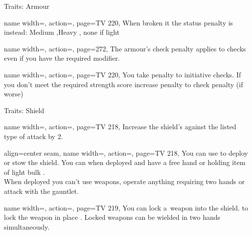 \begin{PageBack}
\begin{Tables}{\backTableHeight}
\begin{Table}{Traits: Armour}
\begin{entry}{}{%
                name width=\conditionLength,%
                action=\Laminar,
                page=TV 220,
            }
                When broken it the status penalty is instead: \quad Medium ,\quad Heavy , \quad none
                if light
            \end{entry}%
            \begin{entry}{}{%
                name width=\conditionLength,%
                action=\Noisy,
                page=272,
            }
                The armour's check penalty applies to \StealthT checks even if you have the required \Strength
                modifier.
            \end{entry}%
            \begin{entry}{}{%
                name width=\conditionLength,%
                action=\Ponderous,
                page=TV 220,
            }
                You take  penalty to initiative checks. If you don't meet the required strength score
                increase penalty to check penalty {(if worse)}
            \end{entry}%
        \end{Table}
        \TableSpace
        \begin{Table}{Traits: Shield}
            \begin{entry}{}{%
                name width=\conditionLength,%
                action=\Deflecting,
                page=TV 218,
            }
                Increase the shield's \Hardness against the listed type of attack by 2.
            \end{entry}
            \begin{entry}{}{%
                align=center seam,
                name width=\conditionLength,%
                action=\Foldaway,
                page=TV 218,
            }
                You can use  to deploy or stow the shield.
                You can  when deployed and have a free hand or holding item of light bulk . \\ When deployed you can't use weapons, operate anything requiring two hands or
                attack with the gauntlet.
            \end{entry}
            \begin{entry}{}{%
                name width=\conditionLength,%
                action=\Harnessed,
                page=TV 219,
            }
                You can lock a \Jousting\,weapon into the shield.  to lock the weapon in place
                . Locked weapons can be wielded in two hands simultaneously.\\

\end{entry}
\end{Table}
\end{Tables}
\end{PageBack}
